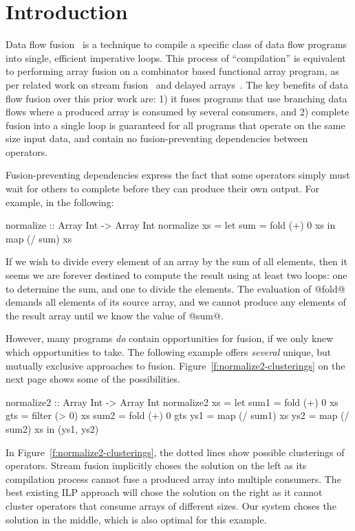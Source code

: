\section{Introduction}

Data flow fusion~\cite{lippmeier2013flow} is a technique to compile a specific class of data flow programs into single, efficient imperative loops. This process of ``compilation'' is equivalent to performing array fusion on a combinator based functional array program, as per related work on stream fusion~\cite{coutts2007streamfusion} and delayed arrays~\cite{keller2010repa}. The key benefits of data flow fusion over this prior work are: 1) it fuses programs that use branching data flows where a produced array is consumed by several consumers, and 2) complete fusion into a single loop is guaranteed for all programs that operate on the same size input data, and contain no fusion-preventing dependencies between operators.

Fusion-preventing dependencies express the fact that some operators simply must wait for others to complete before they can produce their own output. For example, in the following:
\begin{code}
  normalize :: Array Int -> Array Int
  normalize xs = let sum = fold (+) 0 xs
                 in  map (/ sum) xs
\end{code}

If we wish to divide every element of an array by the sum of all elements, then it seems we are forever destined to compute the result using at least two loops: one to determine the sum, and one to divide the elements. The evaluation of @fold@ demands all elements of its source array, and we cannot produce any elements of the result array until we know the value of @sum@. 

However, many programs \emph{do} contain opportunities for fusion, if we only knew which opportunities to take. The following example offers \emph{several} unique, but mutually exclusive approaches to fusion. Figure~\ref{f:normalize2-clusterings} on the next page shows some of the possibilities.
\begin{code}
 normalize2 :: Array Int -> Array Int
 normalize2 xs
  = let sum1 = fold   (+)  0   xs
        gts  = filter (> 0)    xs
        sum2 = fold   (+)  0   gts
        ys1  = map    (/ sum1) xs
        ys2  = map    (/ sum2) xs
    in (ys1, ys2)
\end{code}

In Figure~\ref{f:normalize2-clusterings}, the dotted lines show possible clusterings of operators. Stream fusion implicitly choses the solution on the left as its compilation process cannot fuse a produced array into multiple consumers. The best existing ILP approach will chose the solution on the right as it cannot cluster operators that consume arrays of different sizes. Our system choses the solution in the middle, which is also optimal for this example. 

